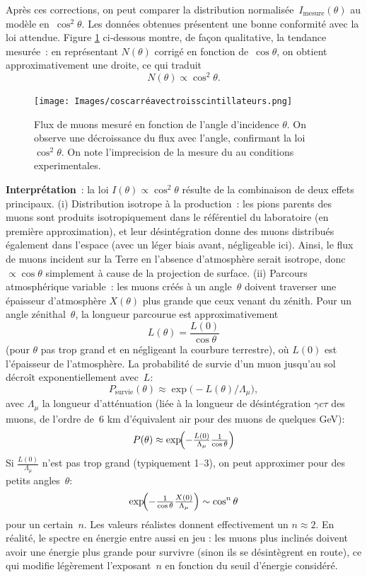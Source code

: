 \documentclass[a4paper,12pt,twoside]{article}
\begin{document}
Après ces corrections, on peut comparer la distribution normalisée~$I_{\mathrm{mesure}}(\theta)$ au modèle en~$\cos^{2}\theta$. Les données obtenues présentent une bonne conformité avec la loi attendue. 
Figure \ref{fig:cos2s} ci‑dessous montre, de façon qualitative, la tendance mesurée~: en représentant $N(\theta)$ corrigé en fonction de~$\cos\theta$, on obtient approximativement une droite, ce qui traduit
\[
N(\theta)\propto\cos^{2}\theta.
\]
\begin{figure}[!h]
  \centering
  \texttt{[image: Images/coscarréavectroisscintillateurs.png]}
  \caption{Flux de muons mesuré en fonction de l'angle d'incidence $\theta$. On observe une décroissance du flux avec l'angle, confirmant la loi $\cos^2\theta$. On note l'imprecision de la mesure du au conditions experimentales.}
  \label{fig:cos2s}
\end{figure}

\textbf{Interprétation}~: la loi $I(\theta)\propto\cos^2\theta$ résulte de la combinaison de deux effets principaux.  
(i) Distribution isotrope à la production~: les pions parents des muons sont produits isotropiquement dans le référentiel du laboratoire (en première approximation), et leur désintégration donne des muons distribués également dans l'espace (avec un léger biais avant, négligeable ici).
Ainsi, le flux de muons incident sur la Terre en l'absence d'atmosphère serait isotrope, donc $\propto\cos\theta$ simplement à cause de la projection de surface.  
(ii) Parcours atmosphérique variable~: les muons créés à un angle~$\theta$ doivent traverser une épaisseur d'atmosphère $X(\theta)$ plus grande que ceux venant du zénith. Pour un angle zénithal~$\theta$, la longueur parcourue est approximativement
\[
L(\theta)=\frac{L(0)}{\cos\theta}
\]
(pour $\theta$ pas trop grand et en négligeant la courbure terrestre), où $L(0)$ est l'épaisseur de l'atmosphère. La probabilité de survie d'un muon jusqu'au sol décroît exponentiellement avec~$L$:
\[
P_{\mathrm{survie}}(\theta)\approx\exp\bigl(-L(\theta)/\Lambda_{\mu}\bigr),
\]
avec $\Lambda_{\mu}$ la longueur d'atténuation (liée à la longueur de désintégration $\gamma c\tau$ des muons, de l'ordre de~6 km d'équivalent air pour des muons de quelques GeV):
\[
P(\theta)\approx \exp\!\Bigl(-\tfrac{L(0)}{\Lambda_\mu}\tfrac1{\cos\theta}\Bigr)
\]
Si $\tfrac{L(0)}{\Lambda_\mu}$ n'est pas trop grand (typiquement 1--3), on peut approximer pour des petits angles~$\theta$:
\[
\exp\!\Bigl(-\tfrac1{\cos\theta}\tfrac{X(0)}{\Lambda_\mu}\Bigr)\sim\cos^n\theta
\]
pour un certain~$n$. Les valeurs réalistes donnent effectivement un $n\approx2$. En réalité, le spectre en énergie entre aussi en jeu : les muons plus inclinés doivent avoir une énergie plus grande pour survivre (sinon ils se désintègrent en route), ce qui modifie légèrement l'exposant~$n$ en fonction du seuil d'énergie considéré. 
\end{document}
